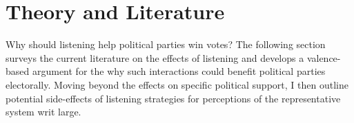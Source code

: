 \documentclass[11pt,a4paper]{scrartcl}
\begin{document}
%		

%		


\section{Theory and Literature}

Why should listening help political parties win votes? The following section surveys the current literature on the effects of listening and develops a valence-based argument for the why such interactions could benefit political parties electorally.  Moving beyond the effects on specific political support, I then outline potential side-effects of listening strategies for perceptions of the representative system writ large.
\end{document}
